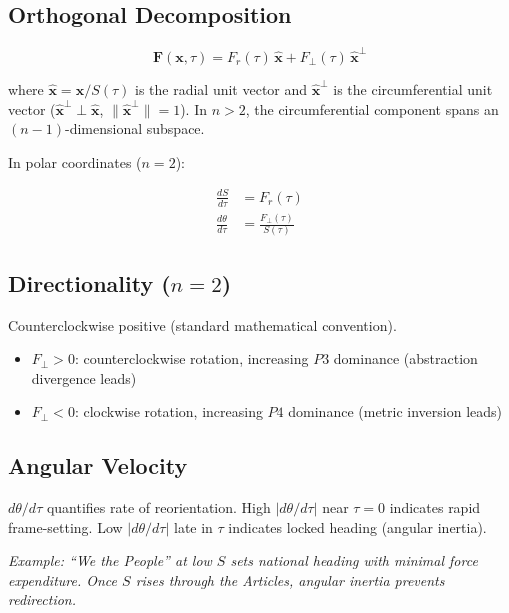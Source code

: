 \documentclass{article}
\begin{document}
\subsection*{Orthogonal Decomposition}

\begin{equation}
\mathbf{F}(\mathbf{x}, \tau) =
  F_r(\tau)\,\hat{\mathbf{x}} +
  F_\perp(\tau)\,\hat{\mathbf{x}}^\perp
\end{equation}

where $\hat{\mathbf{x}} = \mathbf{x}/S(\tau)$ is the radial unit vector
and $\hat{\mathbf{x}}^\perp$ is the circumferential unit vector
($\hat{\mathbf{x}}^\perp \perp \hat{\mathbf{x}}$,
$\|\hat{\mathbf{x}}^\perp\| = 1$). In $n > 2$, the circumferential
component spans an $(n-1)$-dimensional subspace.

In polar coordinates ($n = 2$):

\begin{align}
\frac{dS}{d\tau}     &= F_r(\tau) \\
\frac{d\theta}{d\tau} &= \frac{F_\perp(\tau)}{S(\tau)}
\end{align}

\subsection*{Directionality ($n = 2$)}

Counterclockwise positive (standard mathematical convention).
\begin{itemize}
  \item $F_\perp > 0$: counterclockwise rotation,
    increasing $P3$ dominance (abstraction divergence leads)
  \item $F_\perp < 0$: clockwise rotation,
    increasing $P4$ dominance (metric inversion leads)
\end{itemize}

\subsection*{Angular Velocity}

$d\theta/d\tau$ quantifies rate of reorientation. High $|d\theta/d\tau|$
near $\tau = 0$ indicates rapid frame-setting. Low $|d\theta/d\tau|$
late in $\tau$ indicates locked heading (angular inertia).

\textit{Example: ``We the People'' at low $S$ sets national heading with
minimal force expenditure. Once $S$ rises through the Articles,
angular inertia prevents redirection.}
\end{document}
